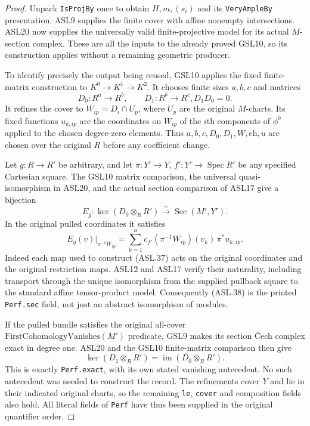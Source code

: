 \documentclass[11pt,a4paper]{article}
\numberwithin{equation}{section}
\theoremstyle{remark}\newtheorem{remark}[theorem]{Remark}
\begin{document}
\begin{proof}
Unpack \texttt{Is\allowbreak{}Proj\allowbreak{}By} once to obtain $H,m,(s_i)$ and its
\texttt{Very\allowbreak{}Ample\allowbreak{}By} presentation.  ASL9 supplies the finite
cover with affine nonempty intersections.  ASL20 now supplies
the universally valid finite-projective model for its actual
$M$-section complex.  These are all the inputs to the already
proved GSL10, so its construction applies without a remaining
geometric producer.

To identify precisely the output being reused, GSL10 applies
the fixed finite-matrix construction to $K^0\to K^1\to K^2$.
It chooses finite sizes $a,b,c$ and matrices
\[
 D_0:R^a\to R^b,\qquad D_1:R^b\to R^c,
                         D_1D_0=0.                  \tag{ASL.36}
\]
It refines the cover to $W_{ip}=D_i\cap U_p$, where $U_p$
are the original $M$-charts.  Its fixed functions $u_{k,ip}$
are the coordinates on $W_{ip}$ of the $i$th components
of $\phi^0$ applied to the chosen degree-zero elements.
Thus $a,b,c,D_0,D_1,W,\mathrm{ch},u$ are chosen over the
original $R$ before any coefficient change.

Let $g:R\to R'$ be arbitrary, and let
$\pi:Y'\to Y$, $f':Y'\to\operatorname{Spec}R'$ be any
specified Cartesian square.  The GSL10 matrix comparison,
the universal quasi-isomorphism in ASL20, and the actual
section comparison of ASL17 give a bijection
\[
 E_g:\ker(D_0\otimes_RR')
                       \xrightarrow{\ \sim\ }\operatorname{Sec}(M',Y').
                                                        \tag{ASL.37}
\]
In the original pulled coordinates it satisfies
\[
 E_g(v)|_{\pi^{-1}W_{ip}}
       =\sum_{k=1}^{a}c_{f'}(\pi^{-1}W_{ip})(v_k)
                                          \,\pi^*u_{k,ip}.
                                                        \tag{ASL.38}
\]
Indeed each map used to construct (ASL.37) acts on the
original coordinates and the original restriction maps.
ASL12 and ASL17 verify their naturality, including transport
through the unique isomorphism from the supplied pullback
square to the standard affine tensor-product model.
Consequently (ASL.38) is the printed \texttt{Perf.\allowbreak sec} field,
not just an abstract isomorphism of modules.

If the pulled bundle satisfies the original all-cover
$\mathrm{FirstCohomologyVanishes}(M')$ predicate, GSL9
makes its section \v Cech complex exact in degree one.
ASL20 and the GSL10 finite-matrix comparison then give
\[
 \ker(D_1\otimes_RR')=\operatorname{im}(D_0\otimes_RR').
                                                        \tag{ASL.39}
\]
This is exactly \texttt{Perf.\allowbreak exact}, with its own stated
vanishing antecedent.  No such antecedent was needed to
construct the record.  The refinements cover $Y$ and lie
in their indicated original charts, so the remaining
\texttt{le}, \texttt{cover} and composition fields also hold.
All literal fields of \texttt{Perf} have thus been supplied
in the original quantifier order.
\end{proof}
\end{document}
